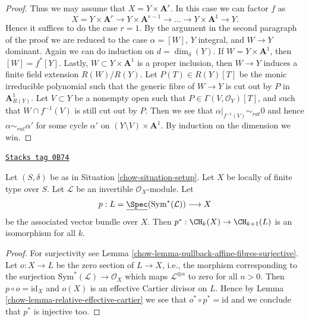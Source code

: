 \begin{proof}
\medskip\noindent
Thus we may assume that $X = Y \times \mathbf{A}^r$.
In this case we can factor $f$ as
$$
X = Y \times \mathbf{A}^r \to
Y \times \mathbf{A}^{r - 1} \to \ldots \to
Y \times \mathbf{A}^1 \to Y.
$$
Hence it suffices to do the case $r = 1$. By the argument in the
second paragraph of the proof we are reduced to the case
$\alpha = [W]$, $Y$ integral, and $W \to Y$ dominant.
Again we can do induction on $d = \dim_\delta(Y)$.
If $W = Y \times \mathbf{A}^1$, then $[W] = f^*[Y]$.
Lastly, $W \subset Y \times \mathbf{A}^1$ is a proper inclusion,
then $W \to Y$ induces a finite field extension $R(W)/R(Y)$.
Let $P(T) \in R(Y)[T]$ be the monic irreducible polynomial such
that the generic fibre of $W \to Y$ is cut out by $P$ in
$\mathbf{A}^1_{R(Y)}$. Let $V \subset Y$ be a nonempty open such
that $P \in \Gamma(V, \mathcal{O}_Y)[T]$, and such that
$W \cap f^{-1}(V)$ is still cut out by $P$. Then we see that
$\alpha|_{f^{-1}(V)} \sim_{rat} 0$ and hence $\alpha \sim_{rat} \alpha'$
for some cycle $\alpha'$ on $(Y \setminus V) \times \mathbf{A}^1$.
By induction on the dimension we win.
\end{proof}

\begin{lemma}[Linebundle]
\label{chow-lemma-linebundle}
\href{https://stacks.math.columbia.edu/tag/0B74}{\texttt{Stacks tag 0B74}}

Let $(S, \delta)$ be as in Situation \ref{chow-situation-setup}.
Let $X$ be locally of finite type over $S$.
Let $\mathcal{L}$ be an invertible $\mathcal{O}_X$-module.
Let
$$
p :
L = \underline{\Spec}(\text{Sym}^*(\mathcal{L}))
\longrightarrow
X
$$
be the associated vector bundle over $X$.
Then $p^* : \CH_k(X) \to \CH_{k + 1}(L)$ is an isomorphism for all $k$.
\end{lemma}

\begin{proof}

For surjectivity see Lemma \ref{chow-lemma-pullback-affine-fibres-surjective}.
Let $o : X \to L$ be the zero section of $L \to X$, i.e., the morphism
corresponding to the surjection $\text{Sym}^*(\mathcal{L}) \to \mathcal{O}_X$
which maps $\mathcal{L}^{\otimes n}$ to zero for all $n > 0$.
Then $p \circ o = \text{id}_X$ and $o(X)$ is an effective
Cartier divisor on $L$. Hence by Lemma \ref{chow-lemma-relative-effective-cartier}
we see that $o^* \circ p^* = \text{id}$ and we conclude that $p^*$ is
injective too.
\end{proof}

